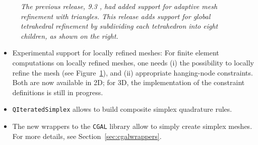 \documentclass{ansarticle-preprint}
\begin{document}
\begin{figure}
  \hfill
  \phantom{.}

  \caption{\it The previous release, 9.3 \cite{dealII93}, had
    added support for adaptive mesh 
  refinement with triangles. This release adds support for global
  tetrahedral refinement by subdividing each tetrahedron into eight
  children, as shown on the right.}
  \label{fig:refinement}
\end{figure}

\begin{itemize}
\item Experimental support for locally refined meshes: For finite
  element computations on locally refined
meshes, one needs (i) the possibility to locally refine the mesh (see
Figure~\ref{fig:refinement}), and (ii) appropriate hanging-node
constraints. Both are now available in 2D; for 3D, the implementation
of the constraint definitions is still in progress.
\item \texttt{QIteratedSimplex} allows to build composite simplex quadrature rules.
\item The new wrappers to the \texttt{CGAL} library allow to simply create simplex
meshes. For more details, see Section~\ref{sec:cgalwrappers}.
\end{itemize}
\end{document}
